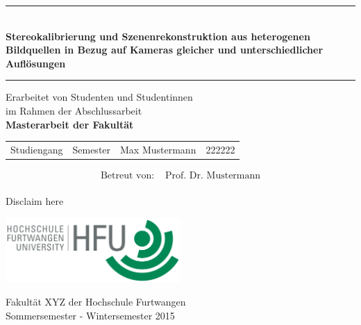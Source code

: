 \begin{titlepage}
\thispagestyle{empty}

\begin{center}
	\enlargethispage{3\baselineskip}
	\hrule
	
	\begin{center} \LARGE \textbf{\\Stereokalibrierung und Szenenrekonstruktion aus heterogenen Bildquellen in Bezug auf Kameras gleicher und unterschiedlicher Auflösungen}
	\end{center}
	
	\vspace{0.5cm}
	
	\hrule
	
	\vspace{2.5cm}
	
	{\Large Erarbeitet von Studenten und Studentinnen\\im Rahmen der Abschlussarbeit\\[2ex]
	\textbf{Masterarbeit der Fakultät}}
	
	\vspace{3cm}
	
	\begin{tabular}{l l l l}
		Studiengang &Semester &Max Mustermann &222222 \vspace{0.2cm} \\	
	\end{tabular}
	
	\vspace{1cm}
	
	\begin{align*}
	\text{Betreut von: }  &\text{Prof. Dr. Mustermann}\\
	\end{align*}	
	
	\vspace{1.0cm}
	
	Disclaim here
	
	\vspace{1.5cm}
	\includegraphics[width=0.5\textwidth]{./images/hfu_logo.png}

	Fakultät XYZ der Hochschule Furtwangen\\[1ex]
	Sommersemester - Wintersemester 2015

\end{center}

\end{titlepage}